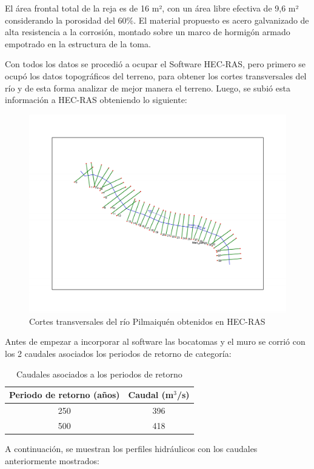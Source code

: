 \documentclass{article} %
\begin{document}
El área frontal total de la reja es de 16 m², con un área libre efectiva de 9,6 m² considerando la porosidad del 60\%.
El material propuesto es acero galvanizado de alta resistencia a la corrosión, montado sobre un marco de hormigón armado empotrado en la estructura de la toma.




Con todos los datos se procedió a ocupar el Software HEC-RAS, pero primero se ocupó los datos topográficos del terreno, para obtener los cortes transversales del río y de esta forma analizar de mejor manera el terreno. Luego, se subió esta información a HEC-RAS obteniendo lo siguiente:
\begin{figure}[h!]
    \centering
    \includegraphics[width=0.6\linewidth]{imagenes/rio_sin_estruc.pdf}
    \caption{Cortes transversales del río Pilmaiquén obtenidos en HEC-RAS}
\end{figure}

Antes de empezar a incorporar al software las bocatomas y el muro se corrió con los 2 caudales asociados los periodos de retorno de categoría:

\begin{table}[h]
    \centering
    \begin{tabular}{c c}
        \textbf{Periodo de retorno (años)} & \textbf{Caudal (m$^3$/s)} \\
        \hline
        250 & 396 \\ 
        500 & 418 \\\hline
    \end{tabular}
    \caption{Caudales asociados a los periodos de retorno}
\end{table}

A continuación, se muestran los perfiles hidráulicos con los caudales anteriormente mostrados:
\end{document}
